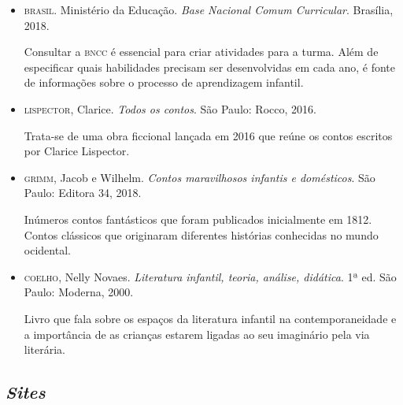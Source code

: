 \documentclass[11pt]{extarticle}
\begin{document}
\begin{itemize}
\item \textsc{brasil}. Ministério da Educação. \textit{Base Nacional Comum Curricular}. Brasília, 2018.

Consultar a \textsc{bncc} é essencial para criar atividades para a turma. Além de especificar quais habilidades precisam ser desenvolvidas em cada ano, é fonte de informações sobre o processo de aprendizagem infantil. 

\item \textsc{lispector}, Clarice. \textit{Todos os contos}. São Paulo: Rocco, 2016.

Trata-se de uma obra ficcional lançada em 2016 que reúne os contos escritos por Clarice Lispector. 
 
\item \textsc{grimm}, Jacob e Wilhelm. \textit{Contos maravilhosos infantis e domésticos}. São Paulo: Editora 34, 2018.

Inúmeros contos fantásticos que foram publicados inicialmente em 1812. Contos clássicos que originaram diferentes histórias conhecidas no mundo ocidental.

\item \textsc{coelho}, Nelly Novaes. \textit{Literatura infantil, teoria, análise, didática}. 1ª ed. São Paulo: Moderna, 2000.

Livro que fala sobre os espaços da literatura infantil na contemporaneidade e a importância de as crianças estarem ligadas ao seu imaginário pela via literária.

\end{itemize}

\subsection{\textit{Sites}}
\end{document}
